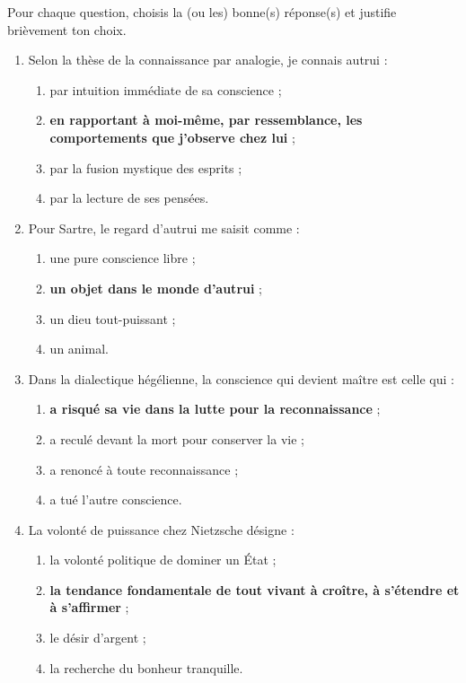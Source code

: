 \documentclass[11pt]{article}
\begin{document}
\begin{exercice}
Pour chaque question, choisis la (ou les) bonne(s) réponse(s) et justifie brièvement ton choix.

\begin{enumerate}
\item Selon la thèse de la connaissance par analogie, je connais autrui :
\begin{enumerate}
\item par intuition immédiate de sa conscience ;
\item \textbf{en rapportant à moi-même, par ressemblance, les comportements que j'observe chez lui} ;
\item par la fusion mystique des esprits ;
\item par la lecture de ses pensées.
\end{enumerate}
\item Pour Sartre, le regard d'autrui me saisit comme :
\begin{enumerate}
\item une pure conscience libre ;
\item \textbf{un objet dans le monde d'autrui} ;
\item un dieu tout-puissant ;
\item un animal.
\end{enumerate}
\item Dans la dialectique hégélienne, la conscience qui devient maître est celle qui :
\begin{enumerate}
\item \textbf{a risqué sa vie dans la lutte pour la reconnaissance} ;
\item a reculé devant la mort pour conserver la vie ;
\item a renoncé à toute reconnaissance ;
\item a tué l'autre conscience.
\end{enumerate}
\item La volonté de puissance chez Nietzsche désigne :
\begin{enumerate}
\item la volonté politique de dominer un État ;
\item \textbf{la tendance fondamentale de tout vivant à croître, à s'étendre et à s'affirmer} ;
\item le désir d'argent ;
\item la recherche du bonheur tranquille.
\end{enumerate}
\end{enumerate}
\end{exercice}
\end{document}

